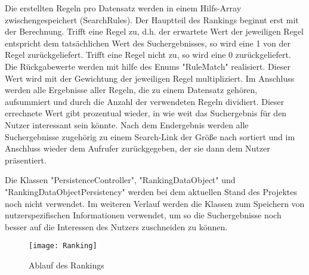 Die erstellten Regeln pro Datensatz werden in einem Hilfs-Array zwischengespeichert (SearchRules). Der Hauptteil des Rankings beginnt erst mit der Berechnung. Trifft eine Regel zu, d.h. der erwartete Wert der jeweiligen Regel entspricht dem tatsächlichen Wert des Suchergebnisses, so wird eine 1 von der Regel zurückgeliefert. Trifft eine Regel nicht zu, so wird eine 0 zurückgeliefert. Die Rückgabewerte werden mit hilfe des Enums "RuleMatch" realisiert. Dieser Wert wird mit der Gewichtung der jeweiligen Regel multipliziert. Im Anschluss werden alle Ergebnisse aller Regeln, die zu einem Datensatz gehören, aufsummiert und durch die Anzahl der verwendeten Regeln dividiert. Dieser errechnete Wert gibt prozentual wieder, in wie weit das Suchergebnis für den Nutzer interessant sein könnte. Nach dem Endergebnis werden alle Suchergebnisse zugehörig zu einem Search-Link der Größe nach sortiert und im Anschluss wieder dem Aufrufer zurückgegeben, der sie dann dem Nutzer präsentiert. 

Die Klassen "PersistenceController", "RankingDataObject" und "RankingDataObjectPersistency" werden bei dem aktuellen Stand des Projektes noch nicht verwendet. Im weiteren Verlauf werden die Klassen zum Speichern von nutzerspezifischen Informationen verwendet, um so die Suchergebnisse noch besser auf die Interessen des Nutzers zuschneiden zu können.

\begin{figure}[h]
	\centering
	\texttt{[image: Ranking]}
	\caption{Ablauf des Rankings}
	\label{fig:Rankingablauf}
\end{figure}


